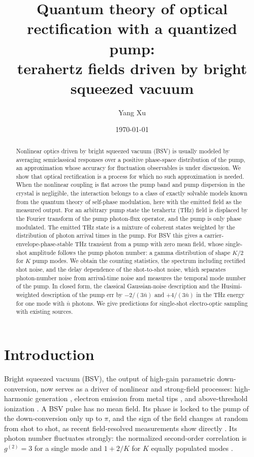 \documentclass[aps,pra,reprint,superscriptaddress,amsmath,amssymb,floatfix]{revtex4-2}
\newcommand{\nbar}{\bar n}
\begin{document}
\title{Quantum theory of optical rectification with a quantized pump:\\
terahertz fields driven by bright squeezed vacuum}

\author{Yang Xu}

\date{\today}

\begin{abstract}
Nonlinear optics driven by bright squeezed vacuum (BSV) is usually modeled by
averaging semiclassical responses over a positive phase-space distribution of
the pump, an approximation whose accuracy for fluctuation observables is under
discussion. We show that optical rectification is a process for which no such
approximation is needed. When the nonlinear coupling is flat across the pump
band and pump dispersion in the crystal is negligible, the interaction belongs
to a class of exactly solvable models known from the quantum theory of
self-phase modulation, here with the emitted field as the measured output.
For an arbitrary pump state the terahertz (THz) field is displaced by the
Fourier transform of the pump photon-flux operator, and the pump is only
phase modulated. The emitted THz state is a mixture of coherent
states weighted by the distribution of photon arrival times in the pump. For
BSV this gives a carrier-envelope-phase-stable THz transient from a pump with
zero mean field, whose single-shot amplitude follows the pump photon number: a
gamma distribution of shape $K/2$ for $K$ pump modes. We obtain the counting
statistics, the spectrum including rectified shot noise, and the delay
dependence of the shot-to-shot noise, which separates photon-number noise from
arrival-time noise and measures the temporal mode number of the pump. In
closed form, the classical Gaussian-noise description and the Husimi-weighted
description of the pump err by $-2/(3\nbar)$ and $+4/(3\nbar)$ in the THz
energy for one mode with $\nbar$ photons. We give predictions for single-shot
electro-optic sampling with existing sources.
\end{abstract}

\maketitle

\section{Introduction}

Bright squeezed vacuum (BSV), the output of high-gain parametric
down-conversion, now serves as a driver of nonlinear and strong-field
processes: high-harmonic generation \cite{gorlach2023,rasputnyi2024}, electron
emission from metal tips \cite{heimerl2025}, and above-threshold ionization
\cite{lyu2025}. A BSV pulse has no mean field. Its phase is locked to the pump
of the down-conversion only up to $\pi$, and the sign of the field changes at
random from shot to shot, as recent field-resolved measurements show directly
\cite{kern2026,gholammirzaei2026}. Its photon number fluctuates strongly: the
normalized second-order correlation is $g^{(2)}=3$ for a single mode and
$1+2/K$ for $K$ equally populated modes \cite{iskhakov2012,sharapova2015}.
\end{document}
